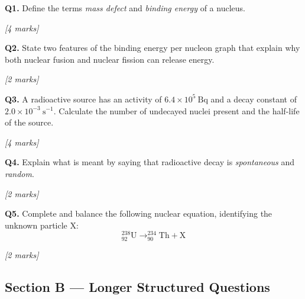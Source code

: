 \begin{tcolorbox}[colback=white, colframe=midblue, breakable]

\begin{minipage}{\linewidth}
\textbf{Q1.} Define the terms \emph{mass defect} and \emph{binding energy} of a nucleus.
\par\hfill\textit{[4 marks]}
\vspace{3.5cm}
\end{minipage}

\begin{minipage}{\linewidth}
\textbf{Q2.} State two features of the binding energy per nucleon graph that explain why both nuclear fusion and nuclear fission can release energy.
\par\hfill\textit{[2 marks]}
\vspace{3.0cm}
\end{minipage}

\begin{minipage}{\linewidth}
\textbf{Q3.} A radioactive source has an activity of $6.4\times10^5\ \text{Bq}$ and a decay constant of $2.0\times10^{-3}\ \text{s}^{-1}$. Calculate the number of undecayed nuclei present and the half-life of the source.
\par\hfill\textit{[4 marks]}
\vspace{3.5cm}
\end{minipage}

\begin{minipage}{\linewidth}
\textbf{Q4.} Explain what is meant by saying that radioactive decay is \emph{spontaneous} and \emph{random}.
\par\hfill\textit{[2 marks]}
\vspace{3.0cm}
\end{minipage}

\begin{minipage}{\linewidth}
\textbf{Q5.} Complete and balance the following nuclear equation, identifying the unknown particle X:
$$^{238}_{92}\text{U} \rightarrow ^{234}_{90}\text{Th} + \text{X}$$
\par\hfill\textit{[2 marks]}
\vspace{2.5cm}
\end{minipage}

\end{tcolorbox}

\subsection*{Section B — Longer Structured Questions}

